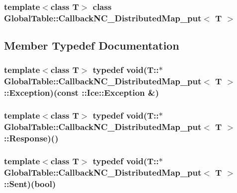 \subsubsection*{template$<$class T$>$ class GlobalTable::CallbackNC\_\-DistributedMap\_\-put$<$ T $>$}



\subsection{Member Typedef Documentation}
\hypertarget{class_global_table_1_1_callback_n_c___distributed_map__put_a9fd25c1d1aa2b2070e3fa23e8ee424b1}{
\subsubsection[{Exception}]{\setlength{\rightskip}{0pt plus 5cm}template$<$class T$>$ typedef void(T::$\ast$ {\bf GlobalTable::CallbackNC\_\-DistributedMap\_\-put}$<$ T $>$::{\bf Exception})(const ::Ice::Exception \&)}}
\label{class_global_table_1_1_callback_n_c___distributed_map__put_a9fd25c1d1aa2b2070e3fa23e8ee424b1}
\hypertarget{class_global_table_1_1_callback_n_c___distributed_map__put_a1816d1339bc29436046f61c3fddd3d79}{
\subsubsection[{Response}]{\setlength{\rightskip}{0pt plus 5cm}template$<$class T$>$ typedef void(T::$\ast$ {\bf GlobalTable::CallbackNC\_\-DistributedMap\_\-put}$<$ T $>$::{\bf Response})()}}
\label{class_global_table_1_1_callback_n_c___distributed_map__put_a1816d1339bc29436046f61c3fddd3d79}
\hypertarget{class_global_table_1_1_callback_n_c___distributed_map__put_a166741a62eb027de0db09fd0a8fd505d}{
\subsubsection[{Sent}]{\setlength{\rightskip}{0pt plus 5cm}template$<$class T$>$ typedef void(T::$\ast$ {\bf GlobalTable::CallbackNC\_\-DistributedMap\_\-put}$<$ T $>$::{\bf Sent})(bool)}}
